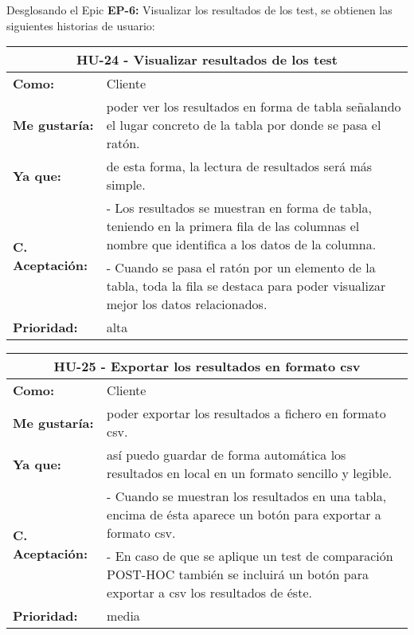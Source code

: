 
Desglosando el Epic \textbf{EP-6:} Visualizar los resultados de los test, se obtienen las siguientes historias de usuario:

\begin{table}[H]
	\begin{tabular}{| p{3cm}| p{11cm} |}
		\hline
		\multicolumn{2}{|c|}{\textbf{HU-24} - Visualizar resultados de los test} \\ \hline
		\textbf{Como:} & Cliente \\ \hline
		\textbf{Me gustaría:} & poder ver los resultados en forma de tabla señalando el lugar concreto de la tabla por donde se pasa el ratón. \\ \hline
		\textbf{Ya que:} & de esta forma, la lectura de resultados será más simple. \\ \hline
		\multirow{2}{11cm}{\textbf{C. Aceptación:}} & - Los resultados se muestran en forma de tabla, teniendo en la primera fila de las columnas el nombre que identifica a los datos de la columna. \\
		& - Cuando se pasa el ratón por un elemento de la tabla, toda la fila se destaca para poder visualizar mejor los datos relacionados. \\ \hline
		\textbf{\textbf{Prioridad:}} & alta \\ \hline
	\end{tabular}
\end{table}


\begin{table}[H]
	\begin{tabular}{| p{3cm}| p{11cm} |}
		\hline
		\multicolumn{2}{|c|}{\textbf{HU-25} - Exportar los resultados en formato csv} \\ \hline
		\textbf{Como:} & Cliente \\ \hline
		\textbf{Me gustaría:} & poder exportar los resultados a fichero en formato csv. \\ \hline
		\textbf{Ya que:} & así puedo guardar de forma automática los resultados en local en un formato sencillo y legible. \\ \hline
		\multirow{2}{11cm}{\textbf{C. Aceptación:}} & - Cuando se muestran los resultados en una tabla, encima de ésta aparece un botón para exportar a formato csv. \\
		& - En caso de que se aplique un test de comparación POST-HOC también se incluirá un botón para exportar a csv los resultados de éste. \\ \hline
		\textbf{\textbf{Prioridad:}} & media \\ \hline
	\end{tabular}
\end{table}

